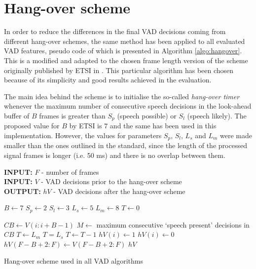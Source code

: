 
\section{Hang-over scheme}
\label{sec:hang}

In order to reduce the differences in the final VAD decisions coming from different hang-over schemes, the same method has been applied to all evaluated VAD features, pseudo code of which is presented in Algorithm \ref{algo:hangover}. This is a modified and adapted to the chosen frame length version of the scheme originally published by ETSI in \cite{ETSIHangover}. This particular algorithm has been chosen because of its simplicity and good results achieved in the evaluation.

The main idea behind the scheme is to initialise the so-called \emph{hang-over timer} whenever the maximum number of consecutive speech decisions in the look-ahead buffer of $B$ frames is greater than $S_p$ (speech possible) or $S_l$ (speech likely). The proposed value for $B$ by ETSI is $7$ and the same has been used in this implementation. However, the values for parameters $S_p$, $S_l$, $L_s$ and $L_m$ were made smaller than the ones outlined in the standard, since the length of the processed signal frames is longer (i.e. 50 ms) and there is no overlap between them.

\begin{algorithm}
\textbf{INPUT:} $F$ - number of frames \\
\textbf{INPUT:} $V$ - VAD decisions prior to the hang-over scheme \\
\textbf{OUTPUT:} $hV$ - VAD decisions after the hang-over scheme
\begin{algorithmic}[1]
\STATE $B \leftarrow 7$ 
\STATE $S_p \leftarrow 2$  
\STATE $S_l \leftarrow 3$ 
\STATE $L_s \leftarrow 5$ 
\STATE $L_m \leftarrow 8$ 
\STATE
\STATE $T \leftarrow 0$ 

\STATE $CB \leftarrow V(i:i+B-1)$ 
\STATE $M \leftarrow$ maximum consecutive `speech present' decisions in $CB$
\STATE $T \leftarrow L_m$
\STATE $T = L_s$
\STATE $T \leftarrow T-1$
\ENDIF
{}
\STATE $hV(i) \leftarrow 1$
\ELSE
\STATE $hV(i) \leftarrow 0$
\ENDIF
\ENDFOR
\STATE $hV(F-B+2:F) \leftarrow V(F-B+2:F)$ 
\RETURN $hV$
\end{algorithmic}
\caption{Hang-over scheme used in all VAD algorithms}
\label{algo:hangover}
\end{algorithm}

